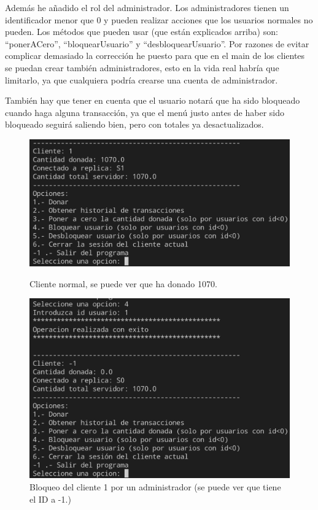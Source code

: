 \documentclass{article}
\begin{document}
Además he añadido el rol del administrador. Los administradores tienen un identificador menor que 0 y pueden realizar acciones que los usuarios normales no pueden. Los métodos que pueden usar (que están explicados arriba) son: ``ponerACero'', ``bloquearUsuario'' y ``desbloquearUsuario''. Por razones de evitar complicar demasiado la corrección he puesto para que en el main de los clientes se puedan crear también administradores, esto en la vida real habría que limitarlo, ya que cualquiera podría crearse una cuenta de administrador.

También hay que tener en cuenta que el usuario notará que ha sido bloqueado cuando haga alguna transacción, ya que el menú justo antes de haber sido bloqueado seguirá saliendo bien, pero con totales ya desactualizados.


\begin{figure}[H]
    \centering
    \begin{minipage}[H]{0.45\textwidth}
        \centering
        \includegraphics[width=\textwidth]{imagenes/bloqueo/1.png}
        \caption{Cliente normal, se puede ver que ha donado 1070.}
    \end{minipage}
    \hfill
    \begin{minipage}[H]{0.45\textwidth}
        \centering
        \includegraphics[width=\textwidth]{imagenes/bloqueo/2.png}
        \caption{Bloqueo del cliente 1 por un administrador (se puede ver que tiene el ID a -1.)}
    \end{minipage}
\end{figure}
\end{document}
